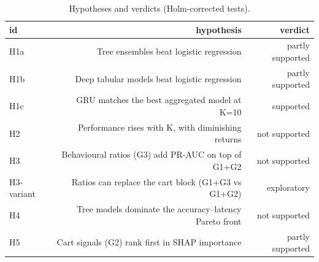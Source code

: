 \begin{table}[t]
\centering
\caption{Hypotheses and verdicts (Holm-corrected tests).}
\label{tab:hyp}
\footnotesize
\begin{tabular}{lrr}
\toprule
id & hypothesis & verdict \\
\midrule
H1a & Tree ensembles beat logistic regression & partly supported \\
H1b & Deep tabular models beat logistic regression & partly supported \\
H1c & GRU matches the best aggregated model at K=10 & supported \\
H2 & Performance rises with K, with diminishing returns & not supported \\
H3 & Behavioural ratios (G3) add PR-AUC on top of G1+G2 & not supported \\
H3-variant & Ratios can replace the cart block (G1+G3 vs G1+G2) & exploratory \\
H4 & Tree models dominate the accuracy–latency Pareto front & not supported \\
H5 & Cart signals (G2) rank first in SHAP importance & partly supported \\
\bottomrule
\end{tabular}
\end{table}
